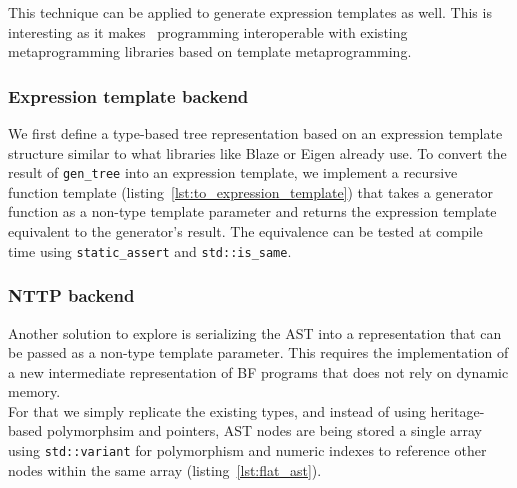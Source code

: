 \documentclass[../../main.tex]{subfiles}
\begin{document}
This technique can be applied to generate expression templates as well.
This is interesting as it makes \constexpr~programming interoperable with
existing metaprogramming libraries based on template metaprogramming.



\subsubsection{Expression template backend}

We first define a type-based tree representation based on an expression template
structure similar to what libraries like Blaze\cite{blazelib} or
Eigen\cite{eigen} already use. To convert the result of \lstinline|gen_tree|
into an expression template, we implement a recursive
function template (listing~\ref{lst:to_expression_template}) that takes a
generator function as a non-type template parameter and returns the expression
template equivalent to the generator's result. The equivalence can be tested
at compile time using \lstinline|static_assert| and \lstinline|std::is_same|.

\subsubsection{NTTP backend}

Another solution to explore is serializing the AST into a representation that
can be passed as a non-type template parameter. This requires the
implementation of a new intermediate representation of BF programs that does
not rely on dynamic memory.\\

For that we simply replicate the existing types, and instead of using
heritage-based polymorphsim and pointers, AST nodes are being stored a single
array using \lstinline|std::variant| for polymorphism and numeric indexes to
reference other nodes within the same array (listing~\ref{lst:flat_ast}).




\end{document}
